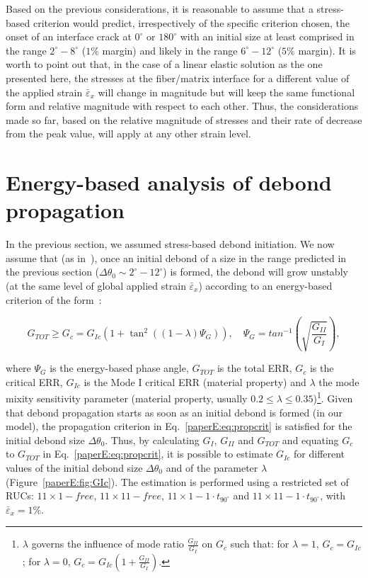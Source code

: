 \vspace{-5pt}
Based on the previous considerations, it is reasonable to assume that a stress-based criterion would predict, irrespectively of the specific criterion chosen, the onset of an interface crack at $0^{\circ}$ or $180^{\circ}$ with an initial size at least comprised in the range $2^{\circ}-8^{\circ}$ ($1\%$ margin) and likely in the range $6^{\circ}-12^{\circ}$ ($5\%$ margin). It is worth to point out that, in the case of a linear elastic solution as the one presented here, the stresses at the fiber/matrix interface for a different value of the applied strain $\bar{\varepsilon}_{x}$ will change in magnitude but will keep the same functional form and relative magnitude with respect to each other. Thus, the considerations made so far, based on the relative magnitude of stresses and their rate of decrease from the peak value, will apply at any other strain level.

\section{Energy-based analysis of debond propagation}

In the previous section, we assumed stress-based debond initiation. We now assume that (as in~\cite{Correa2016}), once an initial debond of a size in the range predicted in the previous section ($\Delta\theta_{0}\sim2^{\circ}-12^{\circ}$) is formed, the debond will grow unstably (at the same level of global applied strain $\bar{\varepsilon}_{x}$) according to an energy-based criterion of the form~\cite{Hutchinson1991,Mantic2009}:

\begin{equation}\label{paperE:eq:propcrit}
G_{TOT}\geq G_{c}=G_{Ic}\left(1+\tan^{2}\left(\left(1-\lambda\right)\Psi_{G}\right)\right),\quad\Psi_{G}=tan^{-1}\left(\sqrt{\frac{G_{II}}{G_{I}}}\right),
\end{equation}

where $\Psi_{G}$ is the energy-based phase angle, $G_{TOT}$ is the total ERR, $G_{c}$ is the critical ERR, $G_{Ic}$ is the Mode I critical ERR (material property) and $\lambda$ the mode mixity sensitivity parameter (material property, usually $0.2\leq\lambda\leq0.35$)\footnote{$\lambda$ governs the influence of mode ratio $\frac{G_{II}}{G_{I}}$ on $G_{c}$ such that: for $\lambda=1$, $G_{c}=G_{Ic}$; for $\lambda=0$, $G_{c}=G_{Ic}\left(1+\frac{G_{II}}{G_{I}}\right)$.}. Given that debond propagation starts as soon as an initial debond is formed (in our model), the propagation criterion in Eq.~\ref{paperE:eq:propcrit} is satisfied for the initial debond size $\Delta\theta_{0}$. Thus, by calculating $G_{I}$, $G_{II}$ and $G_{TOT}$ and equating $G_{c}$ to $G_{TOT}$ in Eq.~\ref{paperE:eq:propcrit}, it is possible to estimate $G_{Ic}$ for different values of the initial debond size $\Delta\theta_{0}$ and of the parameter $\lambda$ (Figure~\ref{paperE:fig:GIc}). The estimation is performed using a restricted set of RUCs: $11\times 1-free$, $11\times 11-free$, $11\times 1-1\cdot t_{90^{\circ}}$ and $11\times 11-1\cdot t_{90^{\circ}}$, with $\bar{\varepsilon}_{x}=1\%$.


